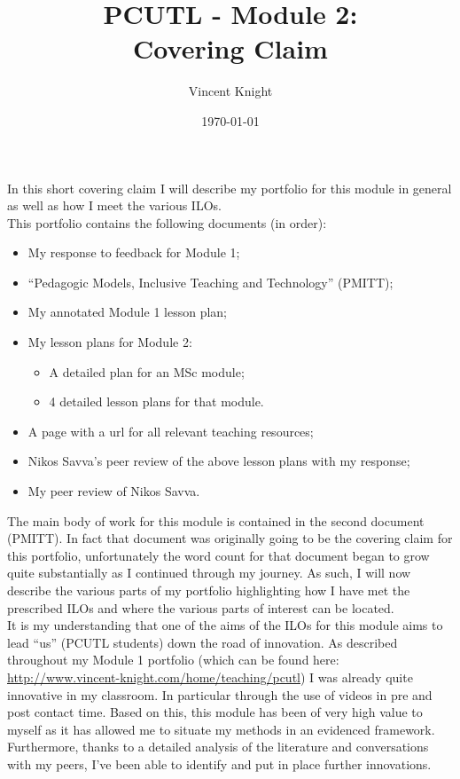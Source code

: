 \documentclass[a4paper,12pt]{article}
\title{PCUTL - Module 2:\\ Covering Claim}
\author{Vincent Knight}
\date{\today}
\begin{document}
\maketitle

In this short covering claim I will describe my portfolio for this module in general as well as how I meet the various ILOs.\\

This portfolio contains the following documents (in order):

\begin{itemize}
    \item My response to feedback for Module 1;
    \item ``Pedagogic Models, Inclusive Teaching and Technology'' (PMITT);
    \item My annotated Module 1 lesson plan;
    \item My lesson plans for Module 2:
        \begin{itemize}
            \item A detailed plan for an MSc module;
            \item 4 detailed lesson plans for that module.
        \end{itemize}
    \item A page with a url for all relevant teaching resources;
    \item Nikos Savva's peer review of the above lesson plans with my response;
    \item My peer review of Nikos Savva.
\end{itemize}

The main body of work for this module is contained in the second document (PMITT). In fact that document was originally going to be the covering claim for this portfolio, unfortunately the word count for that document began to grow quite substantially as I continued through my journey. As such, I will now describe the various parts of my portfolio highlighting how I have met the prescribed ILOs and where the various parts of interest can be located.\\

It is my understanding that one of the aims of the ILOs for this module aims to lead ``us'' (PCUTL students) down the road of innovation. As described throughout my Module 1 portfolio (which can be found here: \url{http://www.vincent-knight.com/home/teaching/pcutl}) I was already quite innovative in my classroom. In particular through the use of videos in pre and post contact time. Based on this, this module has been of very high value to myself as it has allowed me to situate my methods in an evidenced framework. Furthermore, thanks to a detailed analysis of the literature and conversations with my peers, I've been able to identify and put in place further innovations.\\
\end{document}
